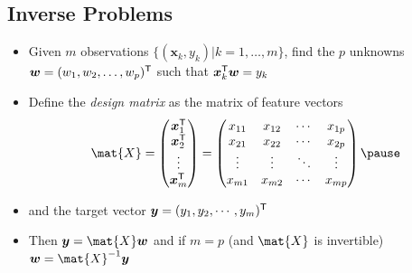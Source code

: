 \begin{slide}
\section{Inverse Problems}

\begin{PauseHighLight}
  \begin{itemize}
  \item Given $m$ observations $\{(\bm{x}_k, y_k)| k=1,\ldots,m\}$, find
    the $p$ unknowns $\bm{w}=(w_1,w_2, \ldots, w_p)^{\textsf{T}}$ such that
    $\bm{x}_k^{\textsf{T}} \bm{w} = y_k$\pause
\item Define the \textit{design matrix} as the matrix of feature vectors
  \begin{displaymath}
    \mat{X} = 
    \begin{pmatrix}
      \bm{x}_1^\tr \\ \bm{x}_2^\tr \\ \vdots \\ \bm{x}_m^\tr
    \end{pmatrix} =
    \begin{pmatrix}
      x_{11} & x_{12} & \cdots & x_{1p}\\
      x_{21} & x_{22} & \cdots & x_{2p}\\
      \vdots & \vdots & \ddots & \vdots \\
      x_{m1} & x_{m2} & \cdots & x_{mp}
    \end{pmatrix}\pause
  \end{displaymath}
\item and the target vector $\bm{y} = (y_1, y_2, \cdots, y_m)^{\textsf{T}}$\pause
\item Then $\bm{y} = \mat{X} \bm{w}$ and if $m=p$ (and $\mat{X}$ is
  invertible) $\bm{w} = \mat{X}^{-1} \bm{y}$\pause
\end{itemize}

\end{PauseHighLight}
\end{slide}


